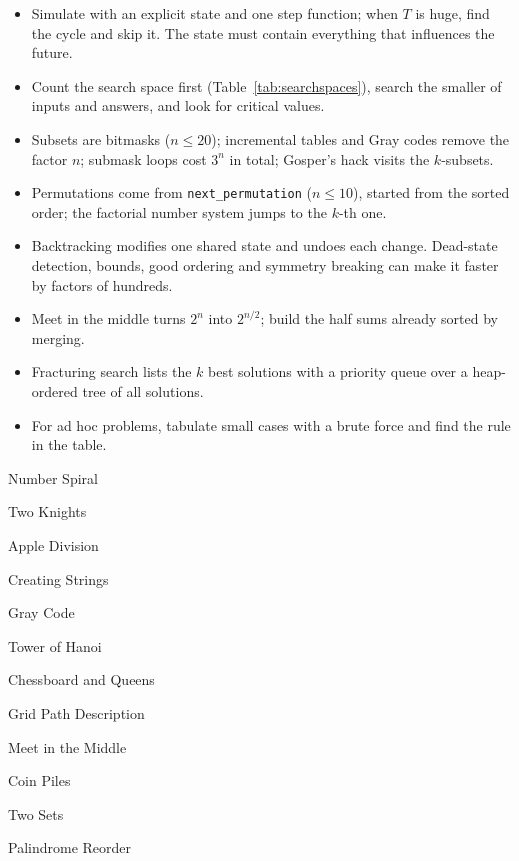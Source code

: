 \begin{summary}
\begin{itemize}
  \item Simulate with an explicit state and one step function; when $T$ is huge, find the cycle and skip it. The state must
        contain everything that influences the future.
  \item Count the search space first (Table~\ref{tab:searchspaces}), search the smaller of inputs and answers, and look for
        critical values.
  \item Subsets are bitmasks ($n \le 20$); incremental tables and Gray codes remove the factor $n$; submask loops cost $3^n$
        in total; Gosper's hack visits the $k$-subsets.
  \item Permutations come from \texttt{next\_permutation} ($n \le 10$), started from the sorted order; the factorial number
        system jumps to the $k$-th one.
  \item Backtracking modifies one shared state and undoes each change. Dead-state detection, bounds, good ordering and
        symmetry breaking can make it faster by factors of hundreds.
  \item Meet in the middle turns $2^n$ into $2^{n/2}$; build the half sums already sorted by merging.
  \item Fracturing search lists the $k$ best solutions with a priority queue over a heap-ordered tree of all solutions.
  \item For ad hoc problems, tabulate small cases with a brute force and find the rule in the table.
\end{itemize}
\end{summary}

\begin{practice}
\begin{pplist}
  \item Number Spiral
  \item Two Knights
  \item Apple Division
  \item Creating Strings
  \item Gray Code
  \item Tower of Hanoi
\end{pplist}
\begin{pplist}
  \item Chessboard and Queens
  \item Grid Path Description
  \item Meet in the Middle
  \item Coin Piles
  \item Two Sets
  \item Palindrome Reorder
\end{pplist}
\end{practice}
